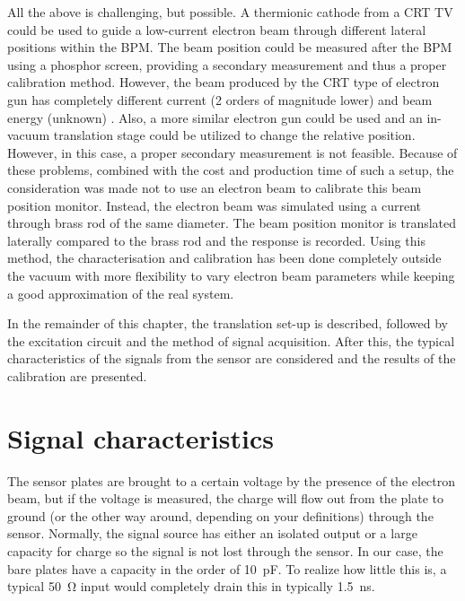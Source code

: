 All the above is challenging, but possible. A thermionic cathode from a CRT TV could be used to guide a low-current electron beam through different lateral positions within the BPM. The beam position could be measured after the BPM using a phosphor screen, providing a secondary measurement and thus a proper calibration method. However, the beam produced by the CRT type of electron gun has completely different current (2 orders of magnitude lower) and beam energy (unknown) .
Also, a more similar electron gun could be used and an in-vacuum translation stage could be utilized to change the relative position. However, in this case, a proper secondary measurement is not feasible.
Because of these problems, combined with the cost and production time of such a setup, the consideration was made not to use an electron beam to calibrate this beam position monitor. Instead, the electron beam was simulated using a current through brass rod of the same diameter.
The beam position monitor is translated laterally compared to the brass rod and the response is recorded. Using this method, the characterisation and calibration has been done completely outside the vacuum with more flexibility to vary electron beam parameters while keeping a good approximation of the real system. 

In the remainder of this chapter, the translation set-up is described, followed by the excitation circuit and the method of signal acquisition. After this, the typical characteristics of the signals from the sensor are considered and the results of the calibration are presented. 

\section{Signal characteristics}
\label{sec:calibration/signal}
The sensor plates are brought to a certain voltage by the presence of the electron beam, but if the voltage is measured, the charge will flow out from the plate to ground (or the other way around, depending on your definitions) through the sensor. Normally, the signal source has either an isolated output  or a large capacity for charge so the signal is not lost through the sensor. In our case, the bare plates have a capacity in the order of \SI{10}{\pico\farad}. To realize how little this is, a typical \SI{50}{\ohm} input would completely drain this in typically \SI{1.5}{\nano\second}.

